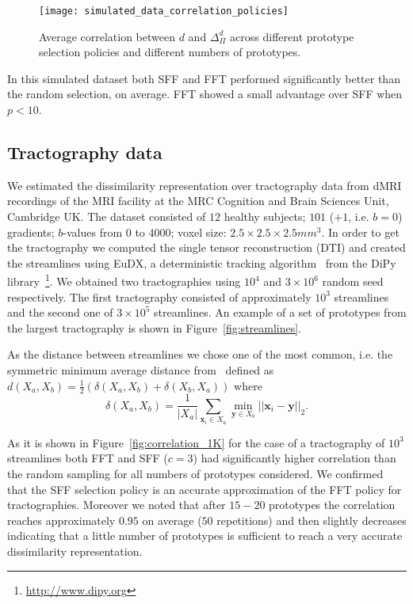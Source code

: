 \begin{figure}
  \centering
  \texttt{[image: simulated\_data\_correlation\_policies]}
  \caption{Average correlation between $d$ and $\Delta_{\Pi}^d$ across
    different prototype selection policies and different numbers of
    prototypes.}
  \label{fig:example_2d_policies}
\end{figure}

In this simulated dataset both SFF and FFT performed significantly
better than the random selection, on average. FFT showed a small
advantage over SFF when $p<10$.


\subsection{Tractography data}
\label{sec:experiments_tractography_data}
We estimated the dissimilarity representation over tractography data
from dMRI recordings of the MRI facility at the MRC Cognition and
Brain Sciences Unit, Cambridge UK. The dataset consisted of $12$
healthy subjects; $101$ ($+1$, i.e. $b=0$) gradients; $b$-values from
0 to 4000; voxel size: $2.5 \times 2.5 \times 2.5 mm^3$. In order to
get the tractography we computed the single tensor reconstruction
(DTI) and created the streamlines using EuDX, a deterministic tracking
algorithm~\cite{garyfallidis2012towards} from the DiPy
library~\footnote{\url{http://www.dipy.org}}. We obtained two
tractographies using $10^4$ and $3 \times 10^6$ random seed
respectively. The first tractography consisted of approximately $10^3$
streamlines and the second one of $3 \times 10^5$ streamlines. An
example of a set of prototypes from the largest tractography is shown
in Figure~\ref{fig:streamlines}.

As the distance between streamlines we chose one of the most common,
i.e. the symmetric minimum average distance
from~\cite{zhang2008identifying} defined as $d(X_a,X_b) =
\frac{1}{2}(\delta(X_a,X_b) + \delta(X_b,X_a))$ where
\begin{equation}
  \label{eq:mam_distance}
  \delta(X_a,X_b) = \frac{1}{|X_a|} \sum_{\mathbf{x}_i \in X_a}
    \min_{\mathbf{y} \in X_b} ||\mathbf{x}_i - \mathbf{y}||_2.
\end{equation}

As it is shown in Figure~\ref{fig:correlation_1K} for the case of a
tractography of $10^3$ streamlines both FFT and SFF ($c = 3$) had
significantly higher correlation than the random sampling for all
numbers of prototypes considered. We confirmed that the SFF selection
policy is an accurate approximation of the FFT policy for
tractographies. Moreover we noted that after $15-20$ prototypes the
correlation reaches approximately $0.95$ on average ($50$ repetitions)
and then slightly decreases indicating that a little number of
prototypes is sufficient to reach a very accurate dissimilarity
representation.

